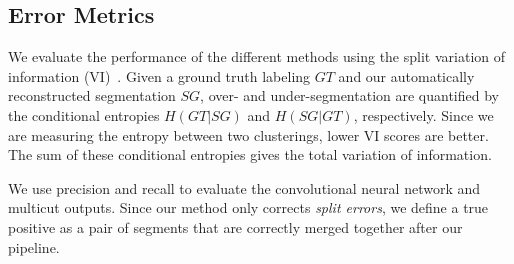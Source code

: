 \subsection{Error Metrics}
\label{sec:variation-of-information}
We evaluate the performance of the different methods using the split variation of information (VI)~\cite{meila2003comparing}.
Given a ground truth labeling $GT$ and our automatically reconstructed segmentation $SG$, over- and under-segmentation are quantified by the conditional entropies $H(GT | SG)$ and $H(SG | GT)$, respectively. 
Since we are measuring the entropy between two clusterings, lower VI scores are better.
The sum of these conditional entropies gives the total variation of information.

We use precision and recall to evaluate the convolutional neural network and multicut outputs. 
Since our method only corrects \textit{split errors}, we define a true positive as a pair of segments that are correctly merged together after our pipeline.